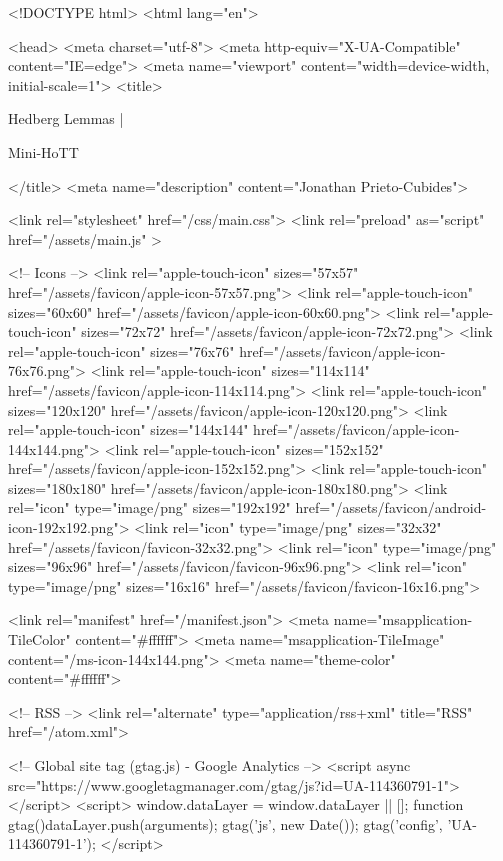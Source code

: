 <!DOCTYPE html>
<html lang="en">

<head>
  <meta charset="utf-8">
  <meta http-equiv="X-UA-Compatible" content="IE=edge">
  <meta name="viewport" content="width=device-width, initial-scale=1">
  <title>
    
      
        Hedberg Lemmas |
      
        Mini-HoTT
    
  </title>
  <meta name="description" content="Jonathan Prieto-Cubides">

  <link rel="stylesheet" href="/css/main.css">
  <link rel="preload" as="script" href="/assets/main.js" >

  <!-- Icons -->
  <link rel="apple-touch-icon" sizes="57x57" href="/assets/favicon/apple-icon-57x57.png">
  <link rel="apple-touch-icon" sizes="60x60" href="/assets/favicon/apple-icon-60x60.png">
  <link rel="apple-touch-icon" sizes="72x72" href="/assets/favicon/apple-icon-72x72.png">
  <link rel="apple-touch-icon" sizes="76x76" href="/assets/favicon/apple-icon-76x76.png">
  <link rel="apple-touch-icon" sizes="114x114" href="/assets/favicon/apple-icon-114x114.png">
  <link rel="apple-touch-icon" sizes="120x120" href="/assets/favicon/apple-icon-120x120.png">
  <link rel="apple-touch-icon" sizes="144x144" href="/assets/favicon/apple-icon-144x144.png">
  <link rel="apple-touch-icon" sizes="152x152" href="/assets/favicon/apple-icon-152x152.png">
  <link rel="apple-touch-icon" sizes="180x180" href="/assets/favicon/apple-icon-180x180.png">
  <link rel="icon" type="image/png" sizes="192x192"  href="/assets/favicon/android-icon-192x192.png">
  <link rel="icon" type="image/png" sizes="32x32" href="/assets/favicon/favicon-32x32.png">
  <link rel="icon" type="image/png" sizes="96x96" href="/assets/favicon/favicon-96x96.png">
  <link rel="icon" type="image/png" sizes="16x16" href="/assets/favicon/favicon-16x16.png">

  <link rel="manifest" href="/manifest.json">
  <meta name="msapplication-TileColor" content="#ffffff">
  <meta name="msapplication-TileImage" content="/ms-icon-144x144.png">
  <meta name="theme-color" content="#ffffff">

  <!-- RSS -->
  <link rel="alternate" type="application/rss+xml" title="RSS" href="/atom.xml">

  <!-- Global site tag (gtag.js) - Google Analytics -->
  <script async src="https://www.googletagmanager.com/gtag/js?id=UA-114360791-1"></script>
  <script>
    window.dataLayer = window.dataLayer || [];
    function gtag(){dataLayer.push(arguments);}
    gtag('js', new Date());
    gtag('config', 'UA-114360791-1');
  </script>

